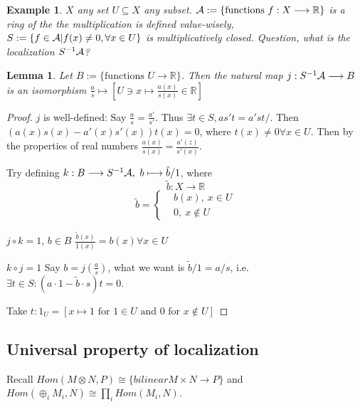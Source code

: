 \documentclass[11pt]{article}
\newtheorem{lemma}[thm]{Lemma}
\newtheorem{ex}[thm]{Example}
\newcommand{\reals}{\mathbb R}
\newcommand{\cala}{{\cal A}}
\newcommand{\lrta}{\longrightarrow}
\begin{document}
\begin{ex}
$X$ any set $U\subseteq X$ any subset.
$\cala:=\{\text{functions } f:X\lrta \reals\}$ is a ring of the the multiplication is defined value-wisely, $S:=\{f\in \cala| f(x)\neq 0, \forall x\in U\}$ is multiplicatively closed. Question, what is the localization $S^{-1}\cala$?
\end{ex}
\begin{lemma}
Let $B:=\{\text{functions }U\lrta \reals\}$.
Then the natural map $j:S^{-1}\cala\lrta B$ is an isomorphism $\frac{a}{s}\mapsto [U\ni x\mapsto\frac{a(x)}{s(x)}\in\reals]$
\end{lemma}
\begin{proof}
$j$ is well-defined:
Say $\frac{a}{s}=\frac{a'}{s'}$. Thus $\exists t\in S, a s' t=a' s t/$. Then $(a(x)s(x)-a'(x)s'(x))t(x)=0$, where $t(x)\neq0\forall x\in U$. Then by the properties of real numbers $\frac{a(x)}{s(x)}=\frac{a'(z)}{s'(x)}$.

Try defining $k:B\lrta S^{-1}\cala,\ b\longmapsto \tilde{b}/1$, where
$$
\tilde{b}:X\lrta \reals
$$
$$
\tilde{b}=\left\{
\begin{aligned}
&b(x),\ x\in U\\
&0, \ x\notin U
\end{aligned}
\right.
$$

$j\circ k=1$, $b\in B$
$\frac{\tilde{b}(x)}{1(x)}=b(x)\forall x\in U$

$k\circ j=1$ Say $b=j(\frac{a}{s})$, what we want is $\tilde{b}/1=a/s$, i.e. $\exists t\in S:(a\cdot 1-\tilde{b}\cdot s)t=0$.

Take $t:1_U=[x\mapsto 1 \text{ for }1\in U \text{ and } 0 \text{ for } x\not \in U]$
\end{proof}

\subsection*{Universal property of localization}
Recall $Hom(M\otimes N, P)\cong \{bilinear M\times N\lrta P\}$ and $Hom(\oplus_{i}M_i,N)\cong \prod_i Hom(M_i,N)$.
\end{document}
